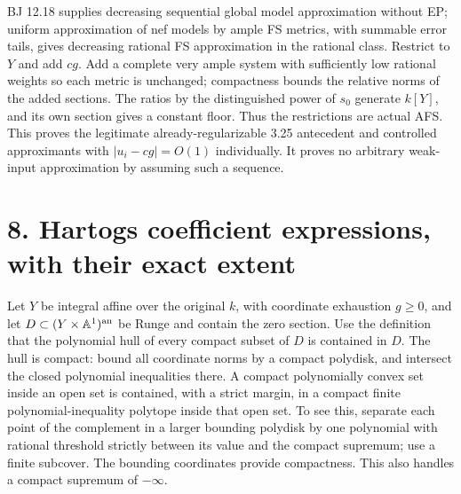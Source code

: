 \documentclass[
  10pt,
]{article}
\begin{document}
BJ 12.18 supplies decreasing sequential global model approximation
without EP; uniform approximation of nef models by ample FS metrics,
with summable error tails, gives decreasing rational FS approximation in
the rational class. Restrict to \(Y\) and add \(cg\). Add a complete
very ample system with sufficiently low rational weights so each metric
is unchanged; compactness bounds the relative norms of the added
sections. The ratios by the distinguished power of \(s_0\) generate
\(k[Y]\), and its own section gives a constant floor. Thus the
restrictions are actual AFS. This proves the legitimate
already-regularizable 3.25 antecedent and controlled approximants with
\(|u_i-cg|=O(1)\) individually. It proves no arbitrary weak-input
approximation by assuming such a sequence.

\section{8. Hartogs coefficient expressions, with their exact
extent}\label{hartogs-coefficient-expressions-with-their-exact-extent}

Let \(Y\) be integral affine over the original \(k\), with coordinate
exhaustion \(g\ge0\), and let \(D\subset(Y\times\mathbb A^1)^{\rm an}\)
be Runge and contain the zero section. Use the definition that the
polynomial hull of every compact subset of \(D\) is contained in \(D\).
The hull is compact: bound all coordinate norms by a compact polydisk,
and intersect the closed polynomial inequalities there. A compact
polynomially convex set inside an open set is contained, with a strict
margin, in a compact finite polynomial-inequality polytope inside that
open set. To see this, separate each point of the complement in a larger
bounding polydisk by one polynomial with rational threshold strictly
between its value and the compact supremum; use a finite subcover. The
bounding coordinates provide compactness. This also handles a compact
supremum of \(-\infty\).
\end{document}
